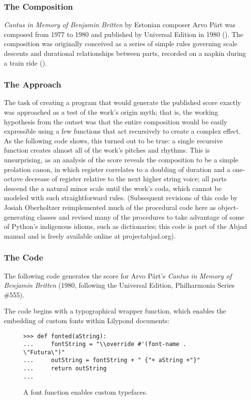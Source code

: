 \subsubsection{The Composition}
\emph{Cantus in Memory of Benjamin Britten} by Estonian composer Arvo P\"{a}rt was composed from 1977 to 1980 and published by Universal Edition in 1980 (\cite{Part:1980fk}). The composition was originally conceived as a series of simple rules governing scale descents and durational relationships between parts, recorded on a napkin during a train ride (\cite{Cope:2010uq}).

\subsubsection{The Approach}
The task of creating a program that would generate the published score exactly was approached as a test of the work's origin myth; that is, the working hypothesis from the outset was that the entire composition would be easily expressible using a few functions that act recursively to create a complex effect. As the following code shows, this turned out to be true: a single recursive function creates almost all of the work's pitches and rhythms. This is unsurprising, as an analysis of the score reveals the composition to be a simple prolation canon, in which register correlates to a doubling of duration and a one-octave decrease of register relative to the next higher string voice; all parts descend the a natural minor scale until the work's coda, which cannot be modeled with such straightforward rules. (Subsequent revisions of this code by Josiah Oberholtzer reimplemented much of the procedural code here as object-generating classes and revised many of the procedures to take advantage of some of Python's indigenous idioms, such as dictionaries; this code is part of the Abjad manual and is freely available online at projectabjad.org).

\subsubsection{The Code}

The following code generates the score for Arvo P\"{a}rt's \emph{Cantus in Memory of Benjamin Britten} (1980, following the Universal Edition, Philharmonia Series \#555).

The code begins with a typographical wrapper function, which enables the embedding of custom fonts within Lilypond documents:

\begin{figure}[h] 
\begin{lstlisting}[basicstyle=\scriptsize\ttfamily, breaklines=True, tabsize=4, showtabs=false, showspaces=false]
>>> def fonted(aString):
...     fontString = "\\override #'(font-name . \"Futura\")"
...     outString = fontString + " {"+ aString +"}"
...     return outString
... \end{lstlisting}

\caption{A font function enables custom typefaces. } 
\end{figure}


